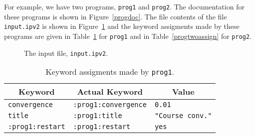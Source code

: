 For example, we have two programs, \verb|prog1| and \verb|prog2|.
The documentation for these programs is shown in Figure~\ref{progdoc}.
The file contents of the file \verb|input.ipv2| is shown in
Figure~\ref{proginputfile}
and the keyword assigments made by these programs are given in
Table~\ref{progoneassign} for \verb|prog1| and in Table~\ref{progtwoassign}
for \verb|prog2|.

\begin{figure}[e]
\centering
{}
\caption{The input file, {\tt input.ipv2}.}
\label{proginputfile}
\end{figure}

\begin{table}[e]
\centering
\begin{tabular}{|l|l|l|}
\hline
\multicolumn{1}{|c}{Keyword}
  & \multicolumn{1}{c}{Actual Keyword}
  & \multicolumn{1}{c|}{Value} \\
\hline
\verb|convergence| & \verb|:prog1:convergence| & \verb|0.01| \\
\verb|title| & \verb|:prog1:title| & \verb|"Course conv."| \\
\verb|:prog1:restart| & \verb|:prog1:restart| & \verb|yes| \\
\hline
\end{tabular}
\caption{Keyword assigments made by {\tt prog1}.}
\label{progoneassign}
\end{table}

